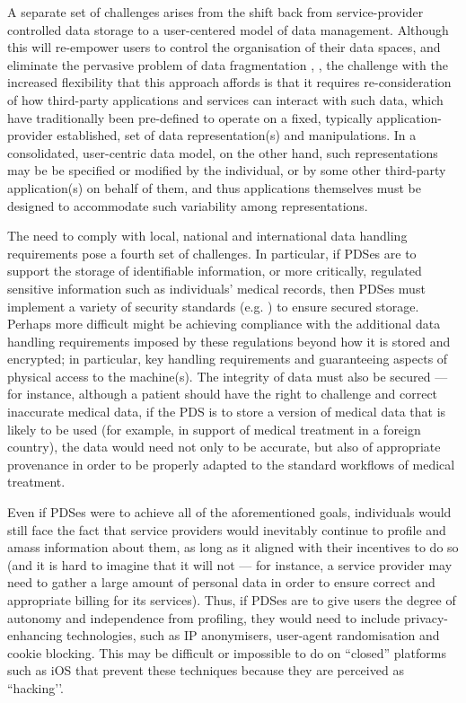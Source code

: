 \documentclass{acm_proc_article-sp}
\begin{document}
A separate set of challenges arises from the shift back from service-provider controlled data storage to a user-centered model of data management. Although this will re-empower users to control the organisation of their data spaces, and eliminate the pervasive problem of data fragmentation \cite{karger2006data}, \cite{heath2011linked}, the challenge with the increased flexibility that this approach affords is that it requires re-consideration of how third-party applications and services can interact with such data, which have traditionally been pre-defined to operate on a fixed, typically application-provider established, set of data representation(s) and manipulations.  In a consolidated, user-centric data model, on the other hand, such representations may be be specified or modified by the individual, or by some other third-party application(s) on behalf of them, and thus applications themselves must be designed to accommodate such variability among representations.

The need to comply with local, national and international data handling requirements pose a fourth set of challenges. In particular, if  PDSes are to support the storage of identifiable information, or more critically, regulated sensitive information such as individuals’ medical records, then PDSes must implement a variety of security standards (e.g. \cite{mccallister2010guide}) to ensure secured storage.  Perhaps more difficult might be achieving compliance with the additional data handling requirements imposed by these regulations beyond how it is stored and encrypted; in particular, key handling requirements and guaranteeing aspects of physical access to the machine(s). The integrity of data must also be secured --- for instance, although a patient should have the right to challenge and correct inaccurate medical data, if the PDS is to store a version of medical data that is likely to be used (for example, in support of medical treatment in a foreign country), the data would need not only to be accurate, but also of appropriate provenance in order to be properly adapted to the standard workflows of medical treatment.

Even if PDSes were to achieve all of the aforementioned goals, individuals would still face the fact that service providers would inevitably continue to profile and amass information about them, as long as it aligned with their incentives to do so (and it is hard to imagine that it will not --- for instance, a service provider may need to gather a large amount of personal data in order to ensure correct and appropriate billing for its services).  Thus, if PDSes are to give users the degree of autonomy and independence from profiling, they would need to include privacy-enhancing technologies, such as IP anonymisers, user-agent randomisation and cookie blocking. This may be difficult or impossible to do on ``closed'' platforms such as iOS that prevent these techniques because they are perceived as ``hacking’’.
\end{document}
